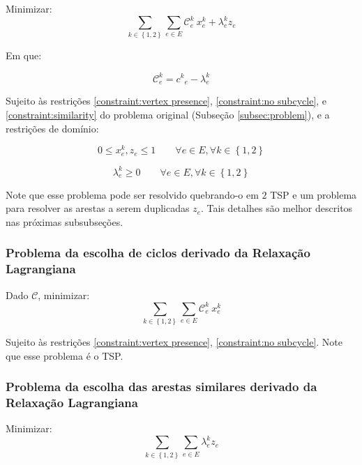 \documentclass{article}
\newcommand{\subsecref}[1]{(Subseção \ref{#1})}
\newcommand{\Set}[1]{\ensuremath{\left\{#1\right\}}}
\newcommand{\Sum}[1]{\ensuremath{\displaystyle\sum\limits_{#1}}}
\newcommand{\edge}{\ensuremath{e}}
\newcommand{\edges}{\ensuremath{E}}
\newcommand{\ncycles}{2}
\newcommand{\allCycles}{\ensuremath{\Set{1, \ncycles}}}
\newcommand{\cycle}{\ensuremath{k}}
\newcommand{\cost}[1]{\ensuremath{c^{#1}}}
\newcommand{\costke}{\ensuremath{\cost{\cycle}_{\edge}}}
\newcommand{\Cost}{\ensuremath{\mathcal{C}}}
\newcommand{\Costke}{\ensuremath{\Cost^{\cycle}_{\edge}}}
\newcommand{\X}[2]{\ensuremath{x^{#1}_{#2}}}
\newcommand{\xke}{\ensuremath{\X{\cycle}{\edge}}}
\newcommand{\ze}{\ensuremath{z_{\edge}}}
\newcommand{\lagrange}{\ensuremath{\lambda}}
\newcommand{\lagrangeke}{\ensuremath{\lagrange_{\edge}^{\cycle}}}
\begin{document}
Minimizar:
\begin{equation}
    \label{eq:goal lagrangian}
 	\Sum{\cycle \in \allCycles}
 	\Sum{\edge \in \edges}
 	\Costke \ \xke
 	+ \lagrangeke \ze
\end{equation}

Em que:

\begin{equation}
	\Costke = \costke - \lagrangeke
\end{equation}

Sujeito às restrições \ref{constraint:vertex presence}, \ref{constraint:no subcycle}, e \ref{constraint:similarity} do problema original \subsecref{subsec:problem}, e a restrições de domínio:

\begin{equation}
	\label{constraint:value of variables}
	0 \leqslant \xke, \ze \leqslant 1
	\qquad
	\forall \edge \in \edges,
	\forall \cycle \in \allCycles
\end{equation}

\begin{equation}
	\label{constraint: lagrange}
	\lagrangeke \geqslant 0
	\qquad
	\forall \edge \in \edges,
	\forall \cycle \in \allCycles
\end{equation}

Note que esse problema pode ser resolvido quebrando-o em $\ncycles$ TSP e um problema para resolver as arestas a serem duplicadas $\ze$. Tais detalhes são melhor descritos nas próximas subsubseções.

\subsubsection{Problema da escolha de ciclos derivado da Relaxação Lagrangiana}

Dado $\Cost$, minimizar:
\begin{equation}
 	\Sum{\cycle \in \allCycles}
 	\Sum{\edge \in \edges}
 	\Costke \ \xke
\end{equation}

Sujeito às restrições \ref{constraint:vertex presence}, \ref{constraint:no subcycle}. Note que esse problema é o TSP.

\subsubsection{Problema da escolha das arestas similares derivado da Relaxação Lagrangiana}

Minimizar:
\begin{equation}
 	\Sum{\cycle \in \allCycles}
 	\Sum{\edge \in \edges}
	\lagrangeke \ze
\end{equation}
\end{document}
